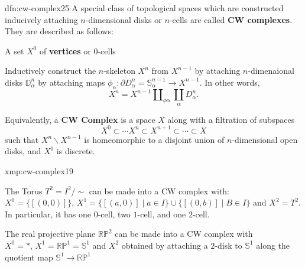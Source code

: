 \documentclass[landscape, 8pt]{extarticle}
\begin{document}
\begin{multicols*}{3}
\begin{dfn}[CW Complexes]{dfn:cw-complex}{25}
	A special class of topological spaces which are constructed inducively attaching $n$-dimensional disks or $n$-cells are called \textbf{CW complexes}. They are described as follows:
	\begin{enumerate-zero}
	    \item A set $X^{0}$ of \textbf{vertices} or $0$-cells
	    \item Inductively construct the $n$-skeleton $X^{n}$ from $X^{n-1}$ by attaching $n$-dimenaional disks $\mathbb{D}^{n}_{\alpha}$ by attaching maps $\phi_{\alpha} : \partial D^{n}_{\alpha} = \mathbb{S}_{\alpha}^{n-1}\to X^{n-1}$. In other words,
			\[X^{n} = X^{n-1} \amalg_{\phi\alpha} \coprod_{\alpha} D^{n}_{\alpha}.\]
	\end{enumerate-zero}
	Equivalently, a \textbf{CW Complex} is a space $X$ along with a filtration of subspaces
	\[X^{0} \subset \cdots X^{n} \subset X^{n+1} \subset \cdots \subset X\]
	such that $X^{n} \backslash X^{n-1}$ is homeomorphic to a disjoint union of $n$-dimensional open disks, and $X^{0}$ is discrete.
\end{dfn}

\begin{xmp}{xmp:cw-complex}{19}
	\begin{enumerate-zero}
	    \item The Torus $T^{2} = I^{2} / \sim$ can be made into a CW complex with: $X^{0} = \{[(0,0)]\},\, X^{1} = \{[(a, 0)] \mid a\in I\} \cup \{[(0, b)] \mid B \in I\}$ and $X^{2} = T^{2}$. In particular, it has one $0$-cell, two $1$-cell, and one $2$-cell.
		\item The real projective plane $\mathbb{RP}^{2}$ can be made into a CW complex with $X^{0} = \ast,\, X^{1} = \mathbb{RP}^{1} = \mathbb{S}^{1}$ and $X^{2}$ obtained by attaching a $2$-disk to $\mathbb{S}^{1}$ along the quotient map $\mathbb{S}^{1} \to \mathbb{RP}^{1}$
	\end{enumerate-zero}
\end{xmp}

\newpage

\end{multicols*}
\end{document}
